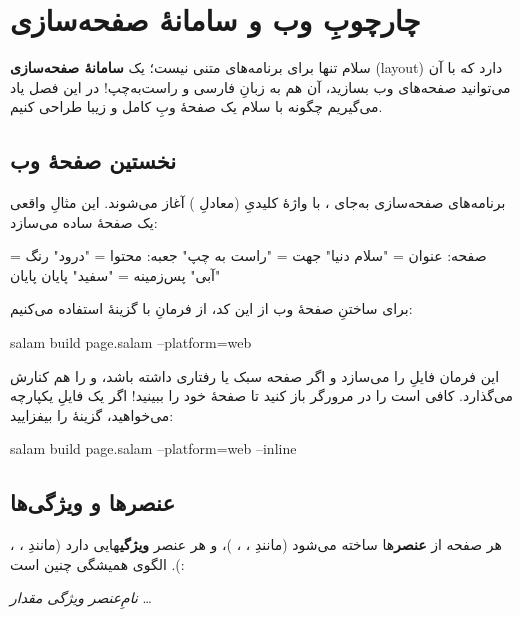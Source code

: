 \chapter{چارچوبِ وب و سامانهٔ صفحه‌سازی}%
\label{ch:web}

سلام تنها برای برنامه‌های متنی نیست؛ یک \textbf{سامانهٔ صفحه‌سازی} (layout) دارد که
با آن می‌توانید صفحه‌های وب بسازید، آن هم به زبانِ فارسی و راست‌به‌چپ! در این
فصل یاد می‌گیریم چگونه با سلام یک صفحهٔ وبِ کامل و زیبا طراحی کنیم.

\section{نخستین صفحهٔ وب}

برنامه‌های صفحه‌سازی به‌جای ، با واژهٔ کلیدیِ 
(معادلِ ) آغاز می‌شوند. این مثالِ واقعی یک صفحهٔ ساده می‌سازد:

\begin{salamfa}
صفحه:
    عنوان = "سلام دنیا"
    جهت = "راست به چپ"
    جعبه:
        محتوا = "درود"
        رنگ = "آبی"
        پس‌زمینه = "سفید"
    پایان
پایان
\end{salamfa}

برای ساختنِ صفحهٔ وب از این کد، از فرمانِ  با گزینهٔ  استفاده می‌کنیم:

\begin{salamen}[language={}]
salam build page.salam --platform=web
\end{salamen}

این فرمان فایلِ  را می‌سازد و اگر صفحه سبک یا رفتاری داشته
باشد،  و  را هم کنارش می‌گذارد. کافی است  را در مرورگر باز کنید تا صفحهٔ خود را ببینید! اگر یک
فایلِ یکپارچه می‌خواهید، گزینهٔ  را بیفزایید:

\begin{salamen}[language={}]
salam build page.salam --platform=web --inline
\end{salamen}

\section{عنصرها و ویژگی‌ها}

هر صفحه از \textbf{عنصر}ها ساخته می‌شود (مانندِ ، ،
)، و هر عنصر \textbf{ویژگی}هایی دارد (مانندِ ،
، ). الگوی همیشگی چنین است:

\begin{center}
\textit{نامِ‌عنصر}\code{:} \quad \textit{ویژگی} \code{=} \textit{مقدار} \quad \ldots \quad {}
\end{center}

